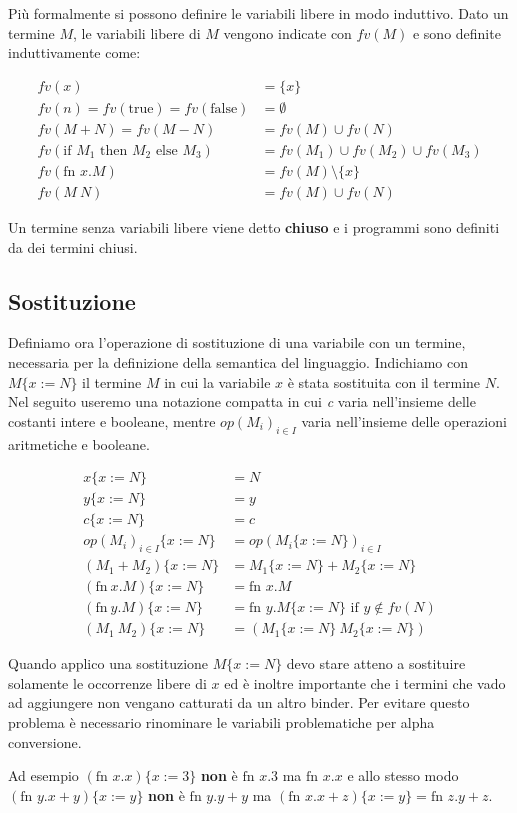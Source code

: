 Più formalmente si possono definire le variabili libere in modo induttivo.
Dato un termine $M$, le variabili libere di $M$ vengono indicate con $fv(M)$ e sono definite induttivamente come:

\begin{align*}
	fv(x) &= \{ x \} \\
	fv(n) =fv(\text{true}) = fv(\text{false}) &= \emptyset \\
	fv(M + N) = fv(M-N) &= fv(M) \cup fv(N) \\
	fv(\text{if } M_1 \text{ then } M_2 \text{ else }M_3) &= fv(M_1) \cup fv(M_2) \cup fv(M_3) \\
	fv(\text{fn }x.M) &= fv(M) \setminus \{x\} \\
	fv(M \: N) &= fv(M) \cup fv(N)
\end{align*}

\noindent Un termine senza variabili libere viene detto \textbf{chiuso} e i programmi sono definiti da dei termini chiusi.

\subsection{Sostituzione}

Definiamo ora l’operazione di sostituzione di una variabile con un termine, necessaria per la definizione della semantica del linguaggio. 
Indichiamo con $M \{x := N\}$ il termine $M$ in cui la variabile $x$ è stata sostituita con il termine $N$.
Nel seguito useremo una notazione compatta in cui \textit{c} varia nell’insieme delle costanti intere e booleane, mentre $op(M_i)_{i\in I}$ varia nell’insieme delle operazioni aritmetiche e booleane.

\begin{align*}
	x \{x := N\} &= N \\
	y \{x := N\} &= y \\
	c \{x := N\} &= c \\
	op(M_i)_{i \in I}\{x := N\}  &= op(M_i\{x := N\} )_{i \in I} \\
	(M_1 + M_2) \{ x:= N \} &= M_1\{x := N\} + M_2 \{x := N\} \\
	(\text{fn} \: x.M)\{x := N\} &= \text{fn }x.M \\
	(\text{fn} \: y.M)\{x := N\}  &= \text{fn }y.M\{x := N\} \text{ if } y \notin fv(N) \\
	(M_1 \: M_2) \{x := N\}  &= (M_1\{x := N\} \: M_2 \{x := N\} )
\end{align*}

\noindent Quando applico una sostituzione $M\{x := N\}$ devo stare atteno a sostituire solamente le occorrenze libere di $x$ ed è inoltre importante che i termini che vado ad aggiungere non vengano catturati da un altro binder.
Per evitare questo problema è necessario rinominare le variabili problematiche per alpha conversione.

Ad esempio $(\text{fn }x.x)\{x := 3\}$ \textbf{non} è $\text{fn }x.3 $ ma $\text{fn }x.x$ e allo stesso modo $(\text{fn }y.x+y)\{x := y\}$ \textbf{non} è $\text{fn }y.y+y$ ma $(\text{fn }x.x+z)\{x := y\} = \text{fn }z.y+z$.





